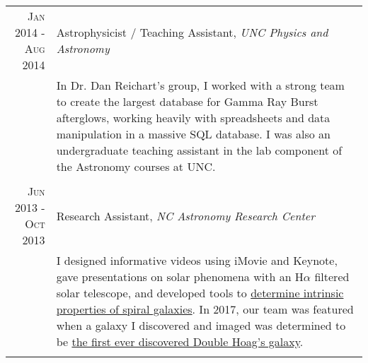 \documentclass[a4paper,10pt]{article} %
\begin{document}
\begin{tabular}{r|p{11cm}}
\textsc{Jan 2014 - Aug 2014} & Astrophysicist / Teaching Assistant, \emph{UNC Physics and Astronomy} \\ 
& \footnotesize{In Dr. Dan Reichart's group, I worked with a strong team to create the largest database for Gamma Ray Burst afterglows, working heavily with spreadsheets and data manipulation in a massive SQL database. I was also an undergraduate teaching assistant in the lab component of the Astronomy courses at UNC.}\\
\multicolumn{2}{c}{} \\


\textsc{Jun 2013 - Oct 2013} & Research Assistant, \emph{NC Astronomy Research Center}\\
& \footnotesize{I designed informative videos using iMovie and Keynote, gave presentations on solar phenomena with an H$\alpha$ filtered solar telescope, and developed tools to \href{https://ui.adsabs.harvard.edu/abs/2014AAS...22345312T/abstract}{determine intrinsic properties of spiral galaxies}. In 2017, our team was featured when a galaxy I discovered and imaged was determined to be \href{http://www.wired.co.uk/article/new-hoag-type-galaxy-discovered}{the first ever discovered Double Hoag's galaxy}.}\\
\multicolumn{2}{c}{} 


\end{tabular}
\end{document}
